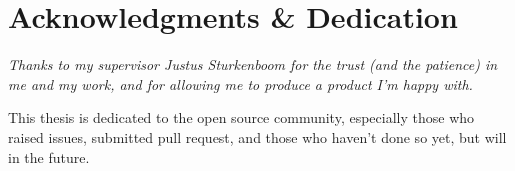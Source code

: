 
\begingroup
  \let\clearpage\relax
  \let\cleardoublepage\relax
  \chapter*{Acknowledgments \& Dedication}

  \itshape
  Thanks to my supervisor Justus Sturkenboom for the trust (and the patience) in me and my work, and for allowing me to produce a product I'm happy with.

  \medskip
  \noindent
  This thesis is dedicated to the open source community, especially those who raised issues, submitted pull request, and those who haven't done so yet, but will in the future.
\endgroup

